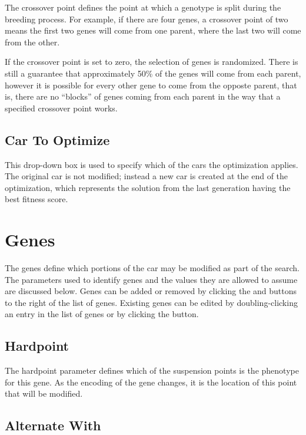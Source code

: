 The crossover point defines the point at which a genotype is split during the breeding process.  For example, if there are four genes, a crossover point of two means the first two genes will come from one parent, where the last two will come from the other.

If the crossover point is set to zero, the selection of genes is randomized.  There is still a guarantee that approximately 50\% of the genes will come from each parent, however it is possible for every other gene to come from the opposte parent, that is, there are no ``blocks'' of genes coming from each parent in the way that a specified crossover point works.

\subsection{Car To Optimize} \label{ssec:carToOptimize}

This drop-down box is used to specify which of the cars the optimization applies.  The original car is not modified; instead a new car is created at the end of the optimization, which represents the solution from the last generation having the best fitness score.

\section{Genes} \label{sec:genes}

The genes define which portions of the car may be modified as part of the search.  The parameters used to identify genes and the values they are allowed to assume are discussed below.  Genes can be added or removed by clicking the  and  buttons to the right of the list of genes.  Existing genes can be edited by doubling-clicking an entry in the list of genes or by clicking the  button.

\subsection{Hardpoint} \label{ssec:genesHardpoint}

The hardpoint parameter defines which of the suspension points is the phenotype for this gene.  As the encoding of the gene changes, it is the location of this point that will be modified.

\subsection{Alternate With} \label{ssec:genesAlternateWith}

